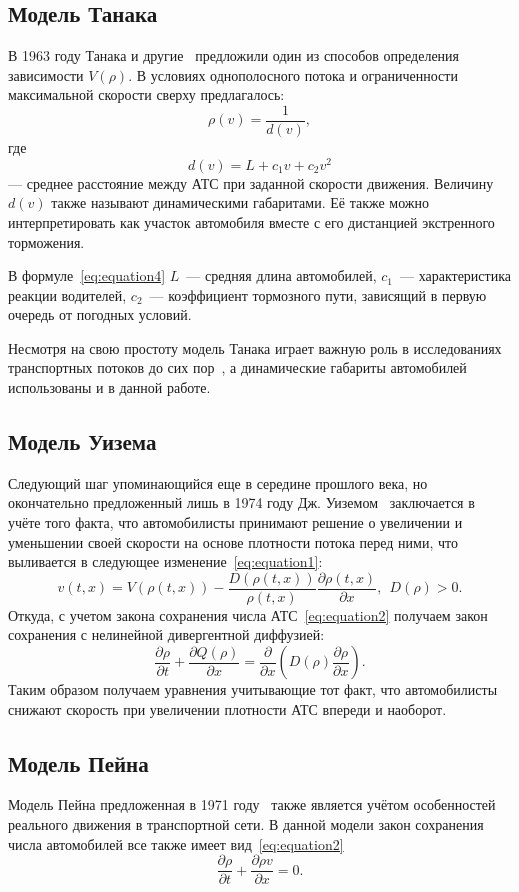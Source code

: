 \subsection{Модель Танака}\label{subsec:ch1/sec1/sub2}
В 1963 году Танака и другие~\cite{inose1983control} предложили один из способов определения зависимости \( V(\rho) \).
В условиях однополосного потока и ограниченности максимальной скорости сверху предлагалось:
\[
\rho(v) = \frac{1}{d(v)},
\]
где
\begin{equation}
    \label{eq:equation4}
    d(v) = L + c_1v + c_2v^2
\end{equation}
--- среднее расстояние между АТС при заданной скорости движения.
Величину $d(v)$ также называют динамическими габаритами.
Её также можно интерпретировать как участок автомобиля вместе с его дистанцией экстренного торможения.

В формуле~\cref{eq:equation4} \(L\)~--- средняя длина автомобилей, \(c_1\)~--- характеристика реакции водителей, \(c_2\)~--- коэффициент тормозного пути, зависящий в первую очередь от погодных условий.

Несмотря на свою простоту модель Танака играет важную роль в исследованиях транспортных потоков до сих пор~\cite{gartner2002traffic}, а динамические габариты автомобилей использованы и в данной работе.

\subsection{Модель Уизема}\label{subsec:ch1/sec1/sub3}
Следующий шаг упоминающийся еще в середине прошлого века, но окончательно предложенный лишь в 1974 году Дж. Уиземом~\cite{uisem1977linear} заключается в учёте того факта, что автомобилисты принимают решение о увеличении и уменьшении своей скорости на основе плотности потока перед ними, что выливается в следующее изменение~\ref{eq:equation1}:
\[
    v(t, x) = V(\rho(t, x)) - \frac{D(\rho(t, x))}{\rho(t,x)}\frac{\partial\rho(t,x)}{\partial x},\ \ D(\rho) > 0.
\]
Откуда, с учетом закона сохранения числа АТС~\ref{eq:equation2} получаем закон сохранения с нелинейной дивергентной диффузией:
\[
    \frac{\partial \rho}{\partial t} + \frac{\partial Q(\rho)}{\partial x} = \frac{\partial}{\partial x} \left(D(\rho) \frac{\partial \rho}{\partial x}\right).
\]
Таким образом получаем уравнения учитывающие тот факт, что автомобилисты снижают скорость при увеличении плотности АТС впереди и наоборот.


\subsection{Модель Пейна}\label{subsec:ch1/sec1/sub4}
Модель Пейна предложенная в 1971 году~\cite{payne1971model} также является учётом особенностей реального движения в транспортной сети.
В данной модели закон сохранения числа автомобилей все также имеет вид~\cref{eq:equation2}
\[
    \frac{\partial \rho}{\partial t} + \frac{\partial \rho v}{\partial x} = 0.
\]


